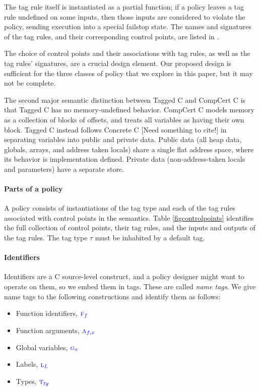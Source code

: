 \documentclass{llncs}
\begin{document}
The tag rule itself is instantiated as a partial function; if a policy leaves a tag rule
undefined on some inputs, then those inputs are considered to violate the policy, sending
execution into a special failstop state. The names and signatures of the tag rules,
and their corresponding control points, are listed in .

The choice of control points and their associations with tag rules, as well as the tag rules'
signatures, are a crucial design element. Our proposed design is sufficient for the three classes of
policy that we explore in this paper, but it may not be complete.

The second major semantic distinction between Tagged C and CompCert C is that Tagged C has no
memory-undefined behavior. CompCert C models memory as a collection of blocks of offsets,
and treats all variables as having their own block. Tagged C instead follows Concrete C
\cite{} [Need something to cite!] in separating variables into public and private data.
Public data (all heap data, globals, arrays, and address taken locals) share a single flat address
space, where its behavior is implementation defined. 
Private data (non-address-taken locals and parameters) have a separate store.


\paragraph*{Parts of a policy}

A policy consists of instantiations of the tag type
and each of the tag rules associated with control points in the semantics. Table \cref{figcontrolpoints}
identifies the full collection of control points, their tag rules, and the inputs and outputs of the tag rules.
The tag type \(\tau\) must be inhabited by a default tag.

\paragraph*{Identifiers}

Identifiers are a C source-level construct, and a policy designer might want to operate on them,
so we embed them in tags. These are called {\em name tags}. We give name tags to the
following constructions and identify them as follows:
\begin{itemize}
\item Function identifiers, \({\color{blue} \textnormal{\sc f}_{f}}\)
\item Function arguments, \({\color{blue} \textnormal{\sc a}_{f,x}}\)
\item Global variables, \({\color{blue} \textnormal{\sc g}_{x}}\)
\item Labels, \({\color{blue} \textnormal{\sc l}_{L}}\)
\item Types, \({\color{blue} \textnormal{\sc t}_{ty}}\)
\end{itemize}
\end{document}
